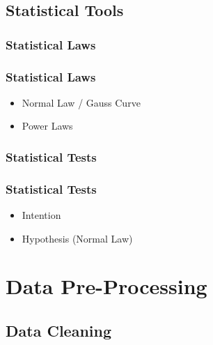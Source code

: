 \subsection{Statistical Tools}

\subsubsection{Statistical Laws}

\begin{frame}\frametitle{Statistical Laws}
   \begin{itemize}
      \item Normal Law / Gauss Curve
      \item Power Laws
   \end{itemize}
\end{frame}


\subsubsection{Statistical Tests}

\begin{frame}\frametitle{Statistical Tests}
   \begin{itemize}
      \item Intention
      \item Hypothesis (Normal Law)
   \end{itemize}
\end{frame}



\section{Data Pre-Processing}


\subsection{Data Cleaning}

